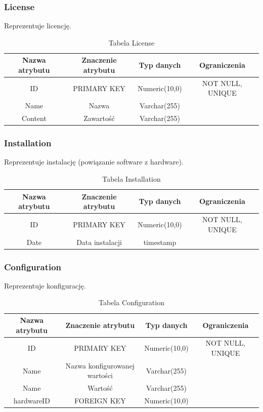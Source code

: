 \subsubsection{License}
Reprezentuje licencję.
\begin{table}[H]
	\renewcommand\arraystretch{1.5}
	\renewcommand\tabcolsep{3pt}
	\begin{tabular}{| c | c | c | c |} 
		\hline \textbf{Nazwa atrybutu} & \textbf{Znaczenie atrybutu} & \textbf{Typ danych} & \textbf{Ograniczenia} \\ 
		\hline ID & PRIMARY KEY & Numeric(10,0) & NOT NULL, UNIQUE \\ 
		\hline Name & Nazwa & Varchar(255) &  \\ 
		\hline Content & Zawartość & Varchar(255) & \\ 
		\hline 
	\end{tabular} 
	\caption{Tabela License}
	\label{TAB:License}
\end{table}

\subsubsection{Installation}
Reprezentuje instalację (powiązanie software z hardware).
\begin{table}[H]
	\renewcommand\arraystretch{1.5}
	\renewcommand\tabcolsep{3pt}
	\begin{tabular}{| c | c | c | c |} 
		\hline \textbf{Nazwa atrybutu} & \textbf{Znaczenie atrybutu} & \textbf{Typ danych} & \textbf{Ograniczenia} \\ 
		\hline ID & PRIMARY KEY & Numeric(10,0) & NOT NULL, UNIQUE \\ 
		\hline Date & Data instalacji & timestamp &  \\ 
		\hline 
	\end{tabular} 
	\caption{Tabela Installation}
	\label{TAB:Installation}
\end{table}

\subsubsection{Configuration}
Reprezentuje konfigurację.
\begin{table}[H]
	\renewcommand\arraystretch{1.5}
	\renewcommand\tabcolsep{3pt}
	\begin{tabular}{| c | c | c | c |} 
		\hline \textbf{Nazwa atrybutu} & \textbf{Znaczenie atrybutu} & \textbf{Typ danych} & \textbf{Ograniczenia} \\ 
		\hline ID & PRIMARY KEY & Numeric(10,0) & NOT NULL, UNIQUE \\ 
		\hline Name & Nazwa konfigurowanej wartości & Varchar(255) &  \\ 
		\hline Name & Wartość & Varchar(255) &  \\
		\hline hardwareID & FOREIGN KEY & Numeric(10,0) & \\ 
		\hline 
	\end{tabular} 
	\caption{Tabela Configuration}
	\label{TAB:Configuration}
\end{table}

